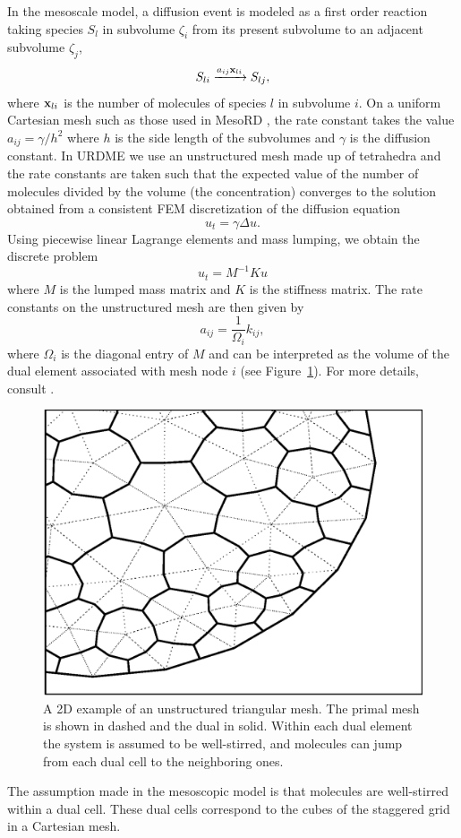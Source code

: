 In the mesoscale model, a diffusion event is modeled as a first order
reaction taking species $S_l$ in subvolume $\zeta_i$ from its present
subvolume to an adjacent subvolume $\zeta_j$,
\begin{equation}
  S_{li} \xrightarrow{a_{ij}\mathbf{x}_{li}} S_{lj},
\end{equation}        
where $\mathbf{x}_{li}$ is the number of molecules of species $l$ in
subvolume $i$. On a uniform Cartesian mesh such as those used in
MesoRD \cite{mesoRD}, the rate constant takes the value $a_{ij}=\gamma
/h^2$ where $h$ is the side length of the subvolumes and $\gamma$ is
the diffusion constant. In URDME we use an unstructured mesh made up
of tetrahedra and the rate constants are taken such that the expected
value of the number of molecules divided by the volume (the
concentration) converges to the solution obtained from a consistent
FEM discretization of the diffusion equation
\begin{equation}
  u_t = \gamma \Delta u.
\end{equation}
Using piecewise linear Lagrange elements and mass lumping, we obtain
the discrete problem
\begin{equation}
  \label{eq:FEM}
  u_t = M^{-1}Ku
\end{equation}
where $M$ is the lumped mass matrix and $K$ is the
stiffness matrix. The rate constants on the unstructured mesh are then
given by
\begin{equation}
  a_{ij} = \frac{1}{\Omega_i} k_{ij}, 
\end{equation}
where $\Omega_i$ is the diagonal entry of $M$ and can be interpreted
as the volume of the dual element associated with mesh node $i$ (see
Figure~\ref{fig:dual}). For more details, consult
\cite{SPDEPEFHL}.

\begin{figure}[htb!]
  \centering  
  \includegraphics[width=0.6\linewidth,height=0.6\linewidth]
    {fig/URDMEmesh}
  \caption{A 2D example of an unstructured triangular mesh. The primal
  mesh is shown in dashed and the dual in solid. Within each dual
  element the system is assumed to be well-stirred, and molecules can
  jump from each dual cell to the neighboring ones.}
  \label{fig:dual}
\end{figure}

The assumption made in the mesoscopic model is that molecules are
well-stirred within a dual cell. These dual cells correspond to the
cubes of the staggered grid in a Cartesian mesh.
